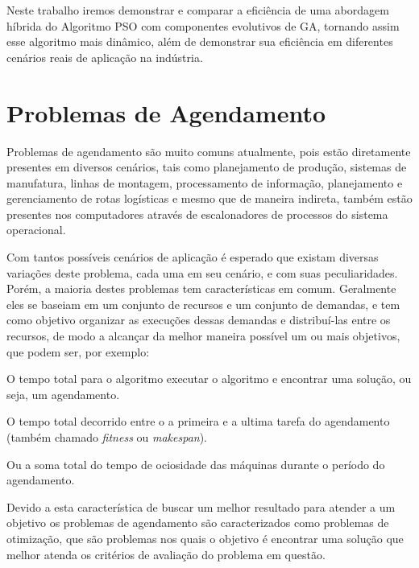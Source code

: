     Neste trabalho iremos demonstrar e comparar a eficiência de uma abordagem híbrida do Algoritmo PSO com componentes evolutivos de GA, tornando assim esse algoritmo mais dinâmico, além de demonstrar sua eficiência em diferentes cenários reais de aplicação na indústria.\hfill


\section{Problemas de Agendamento}
        Problemas de agendamento são muito comuns atualmente, pois estão diretamente presentes em diversos cenários, tais como planejamento de produção, sistemas de manufatura, linhas de montagem, processamento de informação, planejamento e gerenciamento de rotas logísticas e mesmo que de maneira indireta, também estão presentes nos computadores através de escalonadores de processos do sistema operacional.\hfill\vspace{\onelineskip}

        Com tantos possíveis cenários de aplicação é esperado que existam diversas variações deste problema, cada uma em seu cenário, e com suas peculiaridades. Porém, a maioria destes problemas tem características em comum. Geralmente eles se baseiam em um conjunto de recursos e um conjunto de demandas, e tem como objetivo organizar as execuções dessas demandas e distribuí-las entre os recursos, de modo a alcançar da melhor maneira possível um ou mais objetivos, que podem ser, por exemplo: 
        
        O tempo total para o algoritmo executar o algoritmo e encontrar uma solução, ou seja, um agendamento.
        
        O tempo total decorrido entre o a primeira e a ultima tarefa do agendamento (também chamado \textit{fitness} ou \textit{makespan}).
        
        Ou a soma total do tempo de ociosidade das máquinas durante o período do agendamento.\hfill\vspace{\onelineskip}

        Devido a esta característica de buscar um melhor resultado para atender a um objetivo os problemas de agendamento são caracterizados como problemas de otimização, 
        que são problemas nos quais o objetivo é encontrar uma solução que melhor atenda os critérios de avaliação do problema em questão.\hfill\vspace{\onelineskip}
        
